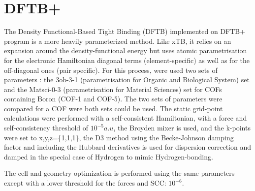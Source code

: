 


\section{DFTB+}
The Density Functional-Based Tight Binding (DFTB) implemented on DFTB+ program is a more heavily parameterized method. Like xTB, it relies on an expansion around the density-functional energy but uses atomic parametrisation for the electronic Hamiltonian diagonal terms (element-specific) as well as for the off-diagonal ones (pair specific).
For this process, were used two sets of parameters : the 3ob-3-1 (parametrisation for Organic and Biological System) set \cite{kubillus_parameterization_2015}\cite{lu_parametrization_2015}\cite{gaus_parameterization_2014}\cite{gaus_parametrization_2013} and the Matsci-0-3 \cite{frenzel_semirelativistic_nodate} (parametrisation for Material Sciences) set for COFs containing Boron (COF-1 and COF-5). The two sets of parameters were compared for a COF were both sets could be used.
The static grid-point calculations were performed with a self-consistent Hamiltonian, with a force and self-consistency threshold of $10^{-5} a.u$, the Broyden mixer is used, and the k-points were set to x,y,z=\{1,1,1\}, the D3 method using the Becke-Johnson damping factor and including the Hubbard derivatives is used for dispersion correction and damped in the special case of Hydrogen to mimic Hydrogen-bonding.

The cell and geometry optimization is performed using the same parameters except with a lower threshold for the forces and SCC: $10^{-6}$. 




